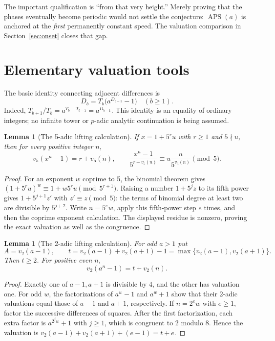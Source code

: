\documentclass[11pt,letterpaper]{article}
\numberwithin{equation}{section}
\newtheorem{lemma}[theorem]{Lemma}
\theoremstyle{definition}
\newcommand{\APS}{\operatorname{APS}}
\begin{document}
The important qualification is ``from that very height.'' Merely proving that
the phases eventually become periodic would not settle the conjecture:
$\APS(a)$ is anchored at the \emph{first} permanently constant speed. The
valuation comparison in Section~\ref{sec:onset} closes that gap.

\section{Elementary valuation tools}

The basic identity connecting adjacent differences is
\begin{equation}\label{eq:diffrec}
 D_b=T_b\bigl(a^{D_{b-1}}-1\bigr)\quad(b\geq1).
\end{equation}
Indeed, $T_{b+1}/T_b=a^{T_b-T_{b-1}}=a^{D_{b-1}}$. This identity is an equality
of ordinary integers; no infinite tower or $p$-adic analytic continuation is
being assumed.

\begin{lemma}[The 5-adic lifting calculation]\label{lem:five}
If $x=1+5^r u$ with $r\geq1$ and $5\nmid u$, then for every positive integer $n$,
\begin{equation}\label{eq:fiveLTE}
 v_5(x^n-1)=r+v_5(n),\qquad
 \frac{x^n-1}{5^{r+v_5(n)}}\equiv
 u\frac{n}{5^{v_5(n)}}\pmod5.
\end{equation}
\end{lemma}
\begin{proof}
For an exponent $w$ coprime to 5, the binomial theorem gives
$(1+5^r u)^w\equiv1+w5^r u\pmod {5^{r+1}}$. Raising a number
$1+5^j z$ to its fifth power gives $1+5^{j+1}z'$ with $z'\equiv z\pmod5$:
the terms of binomial degree at least two are divisible by $5^{j+2}$.
Write $n=5^e w$, apply this fifth-power step $e$ times, and then the coprime
exponent calculation. The displayed residue is nonzero, proving the exact
valuation as well as the congruence.
\end{proof}

\begin{lemma}[The 2-adic lifting calculation]\label{lem:two}
For odd $a>1$ put
\begin{equation}\label{eq:At}
 A=v_2(a-1),\qquad t=v_2(a-1)+v_2(a+1)-1
                  =\max\{v_2(a-1),v_2(a+1)\}.
\end{equation}
Then $t\geq2$. For positive even $n$,
\begin{equation}\label{eq:twoLTE}
 v_2(a^n-1)=t+v_2(n).
\end{equation}
\end{lemma}
\begin{proof}
Exactly one of $a-1,a+1$ is divisible by 4, and the other has valuation one.
For odd $w$, the factorizations of $a^w-1$ and $a^w+1$ show that their
2-adic valuations equal those of $a-1$ and $a+1$, respectively. If
$n=2^e w$ with $e\geq1$, factor the successive differences of squares.
After the first factorization, each extra factor is $a^{2^j w}+1$ with
$j\geq1$, which is congruent to 2 modulo 8. Hence the valuation is
$v_2(a-1)+v_2(a+1)+(e-1)=t+e$.
\end{proof}
\end{document}
